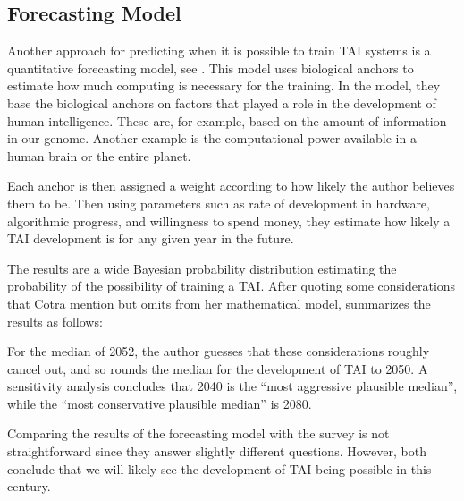 \documentclass[12pt,A4]{report}
\theoremstyle{definition}
\begin{document}
\subsection{Forecasting Model}
Another approach for predicting when it is possible to train TAI systems is a quantitative forecasting model, see \citet{Ajeya}. This model uses biological anchors to estimate how much computing is necessary for the training. In the model, they base the biological anchors on factors that played a role in the development of human intelligence. These are, for example, based on the amount of information in our genome. Another example is the computational power available in a human brain or the entire planet. 

Each anchor is then assigned a weight according to how likely the author believes them to be. Then using parameters such as rate of development in hardware, algorithmic progress, and willingness to spend money, they estimate how likely a TAI development is for any given year in the future. 

The results are a wide Bayesian probability distribution estimating the probability of the possibility of training a TAI. After quoting some considerations that Cotra mention but omits from her mathematical model, \citet{an121} summarizes the results as follows:
\begin{displayquote}
For the median of 2052, the author guesses that these considerations roughly cancel out, and so rounds the median for the development of TAI to 2050. A sensitivity analysis concludes that 2040 is the “most aggressive plausible median”, while the “most conservative plausible median” is 2080.
\end{displayquote}
Comparing the results of the forecasting model with the survey is not straightforward since they answer slightly different questions. However, both conclude that we will likely see the development of TAI being possible in this century.
\end{document}
